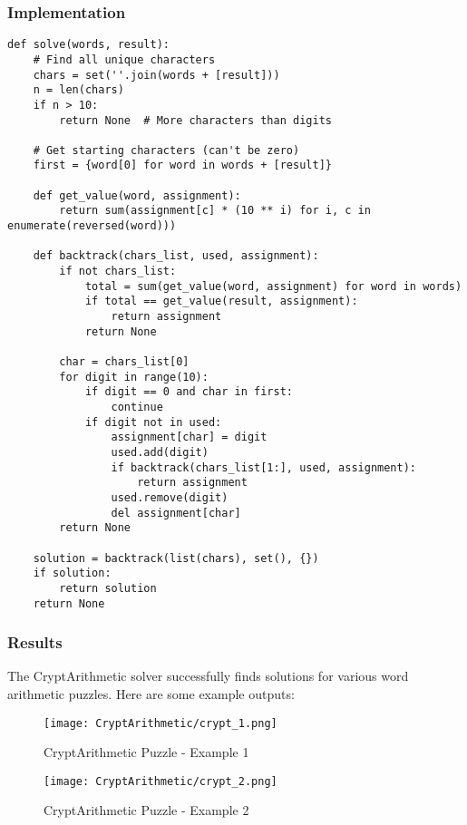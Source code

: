 \documentclass[11pt,a4paper]{article}
\begin{document}
\subsubsection{Implementation}
\begin{lstlisting}[caption=CryptArithmetic Solver Implementation]
def solve(words, result):
    # Find all unique characters
    chars = set(''.join(words + [result]))
    n = len(chars)
    if n > 10:
        return None  # More characters than digits

    # Get starting characters (can't be zero)
    first = {word[0] for word in words + [result]}

    def get_value(word, assignment):
        return sum(assignment[c] * (10 ** i) for i, c in enumerate(reversed(word)))

    def backtrack(chars_list, used, assignment):
        if not chars_list:
            total = sum(get_value(word, assignment) for word in words)
            if total == get_value(result, assignment):
                return assignment
            return None

        char = chars_list[0]
        for digit in range(10):
            if digit == 0 and char in first:
                continue
            if digit not in used:
                assignment[char] = digit
                used.add(digit)
                if backtrack(chars_list[1:], used, assignment):
                    return assignment
                used.remove(digit)
                del assignment[char]
        return None

    solution = backtrack(list(chars), set(), {})
    if solution:
        return solution
    return None
\end{lstlisting}

\subsubsection{Results}
The CryptArithmetic solver successfully finds solutions for various word arithmetic puzzles. Here are some example outputs:

\begin{figure}[H]
    \centering
    \texttt{[image: CryptArithmetic/crypt\_1.png]}
    \caption{CryptArithmetic Puzzle - Example 1}
\end{figure}

\begin{figure}[H]
    \centering
    \texttt{[image: CryptArithmetic/crypt\_2.png]}
    \caption{CryptArithmetic Puzzle - Example 2}
\end{figure}
\end{document}
